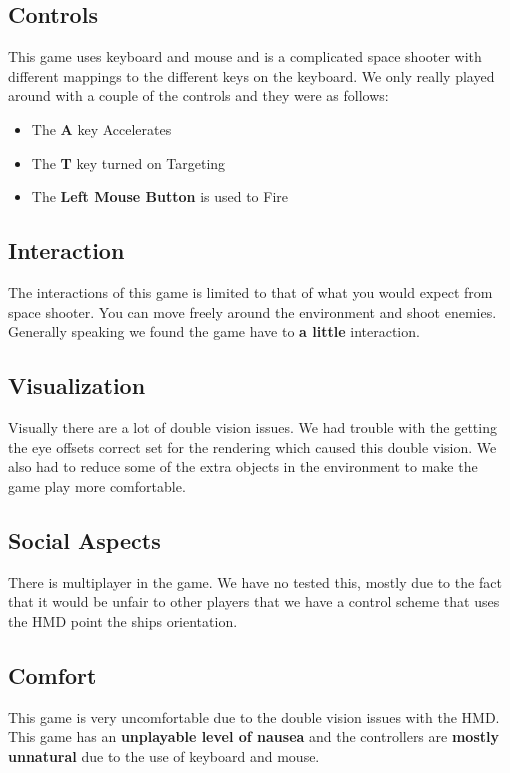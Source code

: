 \documentclass[journal]{IEEEtran}
\begin{document}
\subsection{Controls}
This game uses keyboard and mouse and is a complicated space shooter with different mappings to the different keys on the keyboard. We only really played around with a couple of the controls and they were as follows:

\begin{itemize}
	\item The \textbf{A} key Accelerates 
	\item The \textbf{T} key turned on Targeting 
	\item The \textbf{Left Mouse Button} is used to Fire  
\end{itemize} 

\subsection{Interaction}
The interactions of this game is limited to that of what you would expect from space shooter. You can move freely around the environment and shoot enemies. Generally speaking we found the game have to \textbf{a little} interaction. 


\subsection{Visualization}
Visually there are a lot of double vision issues. We had trouble with the getting the eye offsets correct set for the rendering which caused this double vision. We also had to reduce some of the extra objects in the environment to make the game play more comfortable. 
  
\subsection{Social Aspects}
There is multiplayer in the game. We have no tested this, mostly due to the fact that it would be unfair to other players that we have a control scheme that uses the HMD point the ships orientation. 
\subsection{Comfort}
This game is very uncomfortable due to the double vision issues with the HMD. This game has an \textbf{unplayable level of nausea} and the controllers are \textbf{mostly unnatural} due to the use of keyboard and mouse. 
\end{document}
